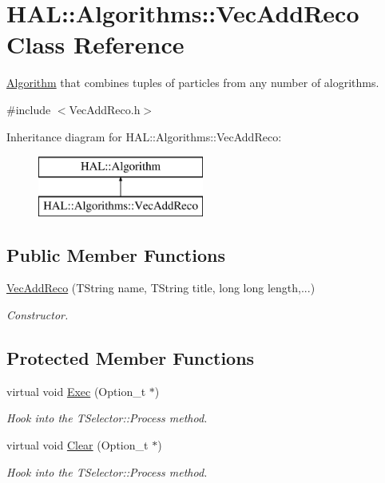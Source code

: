 \hypertarget{class_h_a_l_1_1_algorithms_1_1_vec_add_reco}{\section{H\+A\+L\+:\+:Algorithms\+:\+:Vec\+Add\+Reco Class Reference}
\label{class_h_a_l_1_1_algorithms_1_1_vec_add_reco}
}


\hyperlink{class_h_a_l_1_1_algorithm}{Algorithm} that combines tuples of particles from any number of alogrithms.  




{\ttfamily \#include $<$Vec\+Add\+Reco.\+h$>$}

Inheritance diagram for H\+A\+L\+:\+:Algorithms\+:\+:Vec\+Add\+Reco\+:\begin{figure}[H]
\begin{center}
\leavevmode
\includegraphics[height=2.000000cm]{class_h_a_l_1_1_algorithms_1_1_vec_add_reco}
\end{center}
\end{figure}
\subsection*{Public Member Functions}
\begin{DoxyCompactItemize}
\item 
\hyperlink{class_h_a_l_1_1_algorithms_1_1_vec_add_reco_a50faa627aa37f90ac35eccb3f24fb851}{Vec\+Add\+Reco} (T\+String name, T\+String title, long long length,...)
\begin{DoxyCompactList}\small\item\em Constructor. \end{DoxyCompactList}\end{DoxyCompactItemize}
\subsection*{Protected Member Functions}
\begin{DoxyCompactItemize}
\item 
virtual void \hyperlink{class_h_a_l_1_1_algorithms_1_1_vec_add_reco_a63f7458fec37ae553418b15a375dafa0}{Exec} (Option\+\_\+t $\ast$)
\begin{DoxyCompactList}\small\item\em Hook into the T\+Selector\+::\+Process method. \end{DoxyCompactList}\item 
virtual void \hyperlink{class_h_a_l_1_1_algorithms_1_1_vec_add_reco_afcf9f83e8165c1cbd7a193ab8f9c8445}{Clear} (Option\+\_\+t $\ast$)
\begin{DoxyCompactList}\small\item\em Hook into the T\+Selector\+::\+Process method. \end{DoxyCompactList}\end{DoxyCompactItemize}
